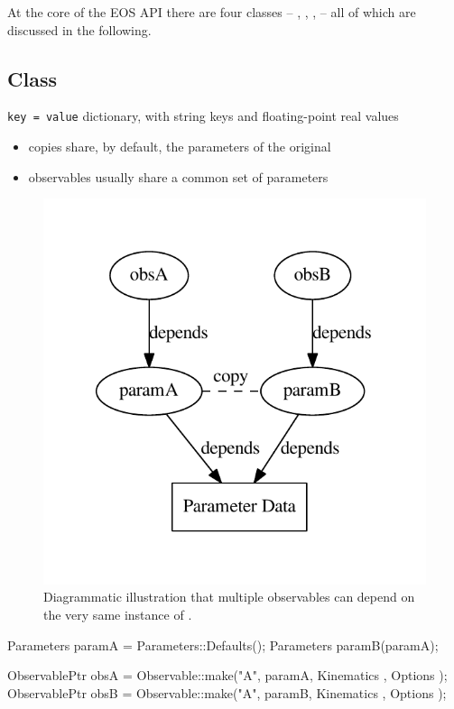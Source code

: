 At the core of the EOS API there are four classes -- , ,
,  -- all of which are discussed in the following.

\subsection{Class }

\texttt{key = value} dictionary, with string keys and floating-point real values\\

\begin{itemize}
    \item copies share, by default, the parameters of the original
    \item observables usually share a common set of parameters
\end{itemize}

\begin{figure}[t]
    \centering
    \includegraphics[width=.5\textwidth]{figures/graph-parameters.pdf}
    \caption{%
        Diagrammatic illustration that multiple observables can depend on the
        very same instance of .
    }
\end{figure}

\begin{sourcecode}
Parameters paramA = Parameters::Defaults();
Parameters paramB(paramA);

ObservablePtr obsA = Observable::make("A", paramA, Kinematics{ }, Options{ });
ObservablePtr obsB = Observable::make("A", paramB, Kinematics{ }, Options{ });
\end{sourcecode}

